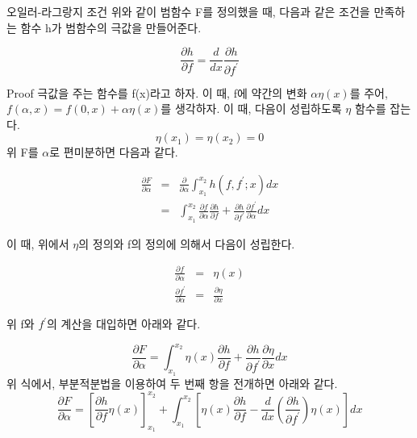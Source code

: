 \documentclass{beamer}
\begin{document}
\begin{frame}{오일러-라그랑지 조건} 
위와 같이 범함수 F를 정의했을 때, 다음과 같은 조건을 만족하는 함수 h가 범함수의 극값을 만들어준다. 

\begin{equation} 
\frac{\partial h}{\partial f} = \frac{d}{dx} \frac{\partial h}{\partial f^{\prime}}
\end{equation}
\end{frame}

\begin{frame}[allowframebreaks]{Proof}
극값을 주는 함수를 f(x)라고 하자. 이 때, f에 약간의 변화 $\alpha \eta(x)$를 주어, $f(\alpha, x) = f(0, x) + \alpha \eta(x)$를 생각하자. 이 때, 다음이 성립하도록 $\eta$ 함수를 잡는다.  
\begin{equation} 
\eta(x_1) = \eta(x_2) = 0
\end{equation}
위 F를 $\alpha$로 편미분하면 다음과 같다. 

\begin{eqnarray} 
\frac{\partial F}{\partial \alpha} 
&=& \frac{\partial}{\partial \alpha} \int^{x_2}_{x_1} h(f, f^{\prime}; x)dx \\ 
&=&  \int^{x_2}_{x_1} \frac{\partial f}{\partial \alpha}\frac{\partial h}{\partial f} + \frac{\partial h}{\partial f^{\prime}}\frac{\partial f^{\prime}}{\partial \alpha} dx 
\end{eqnarray} 

이 때, 위에서 $\eta$의 정의와 f의 정의에 의해서 다음이 성립한다. 

\begin{eqnarray} 
\frac{\partial f}{\partial \alpha} &=& \eta(x) \\
\frac{\partial f^{\prime}}{\partial \alpha} &=& \frac{\partial \eta}{\partial x}
\end{eqnarray}

위 f와 $f^{\prime}$의 계산을 대입하면 아래와 같다. 

\begin{equation} 
\frac{\partial F}{\partial \alpha} = \int^{x_2}_{x_1} \eta(x) \frac{\partial h}{\partial f} + \frac{\partial h}{\partial f^{\prime}}\frac{\partial \eta}{\partial x} dx 
\end{equation}
위 식에서, 부분적분법을 이용하여 두 번째 항을 전개하면 아래와 같다. 
\begin{equation} 
\frac{\partial F}{\partial \alpha} = \left[\frac{\partial h}{\partial f}\eta(x)\right]^{x_2}_{x_1} + \int^{x_2}_{x_1} \left[\eta(x) \frac{\partial h}{\partial f} - \frac{d}{dx}\left(\frac{\partial h}{\partial f^{\prime}}\right)  \eta(x) \right] dx 
\end{equation}


\end{frame}
\end{document}
